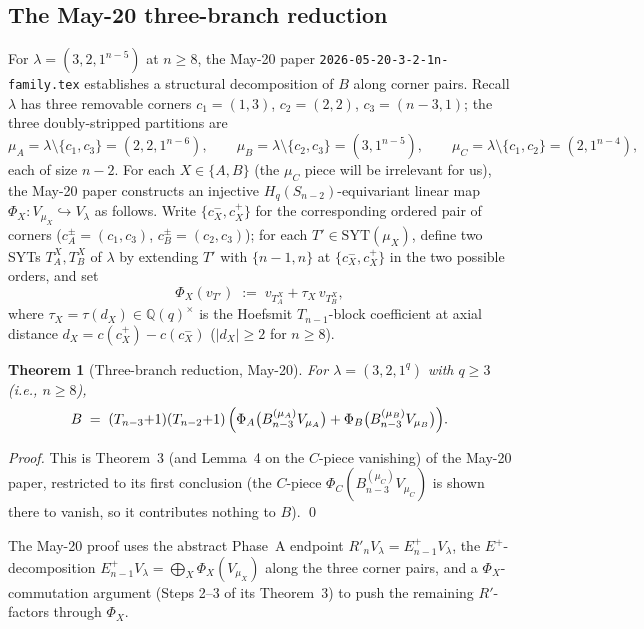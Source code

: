 \documentclass[11pt]{article}
\newtheorem{theorem}{Theorem}
\theoremstyle{definition}
\newcommand{\Hq}{H_q}
\newcommand{\SYT}{\mathrm{SYT}}
\begin{document}
\subsection{The May-20 three-branch reduction}

For $\lambda = (3, 2, 1^{n-5})$ at $n \ge 8$, the May-20 paper
\texttt{2026-05-20-3-2-1n-family.tex} establishes a structural
decomposition of $B$ along corner pairs.  Recall $\lambda$ has three
removable corners $c_1 = (1, 3)$, $c_2 = (2, 2)$, $c_3 = (n-3, 1)$;
the three doubly-stripped partitions are
\[
   \mu_A = \lambda \setminus \{c_1, c_3\} = (2, 2, 1^{n-6}), \qquad
   \mu_B = \lambda \setminus \{c_2, c_3\} = (3, 1^{n-5}), \qquad
   \mu_C = \lambda \setminus \{c_1, c_2\} = (2, 1^{n-4}),
\]
each of size $n - 2$.  For each $X \in \{A, B\}$ (the
$\mu_C$ piece will be irrelevant for us), the May-20 paper constructs
an injective $\Hq(S_{n-2})$-equivariant linear map
$\Phi_X : V_{\mu_X} \hookrightarrow V_\lambda$ as follows.  Write
$\{c_X^-, c_X^+\}$ for the corresponding ordered pair of corners
($c_A^\pm = (c_1, c_3)$, $c_B^\pm = (c_2, c_3)$); for each
$T' \in \SYT(\mu_X)$, define two SYTs $T_A^X, T_B^X$ of $\lambda$ by
extending $T'$ with $\{n-1, n\}$ at $\{c_X^-, c_X^+\}$ in the two
possible orders, and set
\[
   \Phi_X(v_{T'}) \;:=\; v_{T^X_A} + \tau_X\,v_{T^X_B},
\]
where $\tau_X = \tau(d_X) \in \mathbb{Q}(q)^\times$ is the Hoefsmit
$T_{n-1}$-block coefficient at axial distance $d_X = c(c_X^+) -
c(c_X^-)$ ($|d_X| \ge 2$ for $n \ge 8$).

\begin{theorem}[Three-branch reduction, May-20]\label{thm:reduction}
For $\lambda = (3, 2, 1^q)$ with $q \ge 3$ (i.e., $n \ge 8$),
\begin{equation}\label{eq:reduction}
   B \;=\; (T_{n-3}{+}1)(T_{n-2}{+}1)\,
   \Bigl(\Phi_A\bigl(B^{(\mu_A)}_{n-3} V_{\mu_A}\bigr)
   + \Phi_B\bigl(B^{(\mu_B)}_{n-3} V_{\mu_B}\bigr)\Bigr).
\end{equation}
\end{theorem}

\begin{proof}
This is Theorem~3 (and Lemma~4 on the $C$-piece vanishing) of the
May-20 paper, restricted to its first conclusion (the $C$-piece
$\Phi_C(B^{(\mu_C)}_{n-3} V_{\mu_C})$ is shown there to vanish, so it
contributes nothing to $B$).
\qed
\end{proof}

The May-20 proof uses the abstract Phase~A endpoint
$R'_n V_\lambda = E_{n-1}^+ V_\lambda$, the $E^+$-decomposition
$E_{n-1}^+ V_\lambda = \bigoplus_X \Phi_X(V_{\mu_X})$ along the three
corner pairs, and a $\Phi_X$-commutation argument (Steps 2--3 of
its Theorem~3) to push the remaining $R'$-factors through $\Phi_X$.
\end{document}
